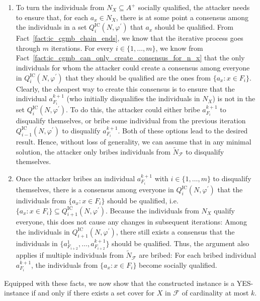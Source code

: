 \documentclass[
    12pt,               %
    a4paper,            %
    bibtotoc,           %
    pointlessnumbers,   %
    ngerman,            %
    titlepage,          %
    leqno,              %
    ]{scrarticle}       %
\newcommand\factref{Fact~\ref}
\begin{document}
\begin{Proof}
\begin{enumerate}[
    topsep=-4pt,
    leftmargin=*,
    itemindent=4.96em,
    label={\textit{Fact \ref*{thm:ic_cgmb_npc}.\arabic*}:},
    ref={\ref*{thm:ic_cgmb_npc}.\arabic*}
]
\item \label{fact:ic_cgmb_optimal_to_bribe_in_n_f}
To turn the individuals from $N_X \subseteq A^+$ socially qualified, the attacker needs to ensure that, for each $a_x \in N_X$, there is at some point a consensus among the individuals in a set $Q^{\text{IC}}_i(N, \varphi^\prime)$ that $a_x$ should be qualified. From \factref{fact:ic_cgmb_chain_ends}, we know that the iterative process goes through $m$ iterations. For every $i \in \{ 1, \ldots, m \}$, we know from \factref{fact:ic_cgmb_can_only_create_consensus_for_n_x} that the only individuals for whom the attacker could create a consensus among everyone in $Q^{\text{IC}}_i(N, \varphi^\prime)$ that they should be qualified are the ones from $\{ a_x : x \in F_i \}$. Clearly, the cheapest way to create this consensus is to ensure that the individual $a^{k+1}_{F_i}$ (who initially disqualifies the individuals in $N_X$) is not in the set $Q^{\text{IC}}_i(N, \varphi^\prime)$. To do this, the attacker could either bribe $a^{k+1}_{F_i}$ to disqualify themselves, or bribe some individual from the previous iteration $Q^{\text{IC}}_{i-1}(N, \varphi^\prime)$ to disqualify $a^{k+1}_{F_i}$. Both of these options lead to the desired result. Hence, without loss of generality, we can assume that in any minimal solution, the attacker only bribes individuals from $\tilde{N}_\mathcal{F}$ to disqualify themselves.

\item \label{fact:ic_cgmb_bribe_some_n_f}
Once the attacker bribes an individual $a^{k+1}_{F_i}$ with $i \in \{ 1, \ldots, m \}$ to disqualify themselves, there is a consensus among everyone in $Q^{\text{IC}}_i(N, \varphi^\prime)$ that the individuals from $\{ a_x : x \in F_i \}$ should be qualified, i.e.\@ $\{ a_x : x \in F_i \} \subseteq Q^{\text{IC}}_{i+1}(N, \varphi^\prime)$. Because the individuals from $N_X$ qualify everyone, this does not cause any changes in subsequent iterations: Among the individuals in $Q^{\text{IC}}_{i+1}(N, \varphi^\prime)$, there still exists a consensus that the individuals in $\{ a^1_{F_{i+2}}, \ldots, a^{k+1}_{F_{i+2}} \}$ should be qualified. Thus, the argument also applies if multiple individuals from $\tilde{N}_\mathcal{F}$ are bribed: For each bribed individual $a^{k+1}_{F_i}$, the individuals from $\{ a_x : x \in F_i \}$ become socially qualified.
\end{enumerate}



Equipped with these facts, we now show that the constructed instance is a YES-instance if and only if there exists a set cover for $X$ in $\mathcal{F}$ of cardinality at most $k$.


\end{Proof}
\end{document}
